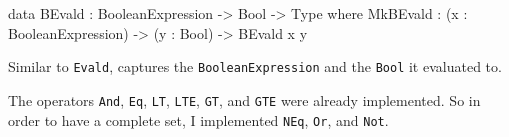         \begin{code}[caption={The \texttt{BEvald} data type}]
        data BEvald : BooleanExpression -> Bool -> Type where
            MkBEvald : (x : BooleanExpression) ->
                        (y : Bool) -> BEvald x y
        \end{code}
        Similar to \texttt{Evald}, captures the \texttt{BooleanExpression} and the \texttt{Bool} it evaluated to.
        \\\par
        
        The operators \texttt{And}, \texttt{Eq}, \texttt{LT}, \texttt{LTE}, \texttt{GT}, and \texttt{GTE} were already implemented. So in order to have a complete set, I implemented \texttt{NEq}, \texttt{Or}, and \texttt{Not}.

